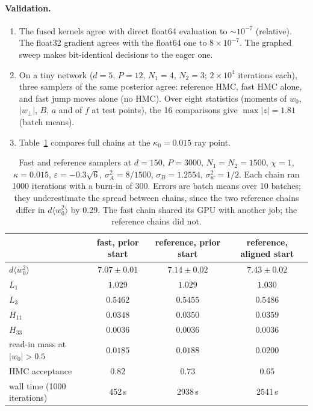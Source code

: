 \documentclass[11pt,a4paper]{article}
\begin{document}
\paragraph{Validation.}
\begin{enumerate}
  \item The fused kernels agree with direct float64 evaluation to $\sim10^{-7}$ (relative).
    The float32 gradient agrees with the float64 one to $8\times10^{-7}$.
    The graphed sweep makes bit-identical decisions to the eager one.
  \item On a tiny network ($d=5$, $P=12$, $N_1=4$, $N_2=3$; $2\times10^4$ iterations each), three samplers of the same posterior agree:
    reference HMC, fast HMC alone, and fast jump moves alone (no HMC).
    Over eight statistics (moments of $w_0$, $|w_\perp|$, $B$, $a$ and of $f$ at test points), the 16 comparisons give $\max|z|=1.81$ (batch means).
  \item Table~\ref{tab:fast} compares full chains at the $\kappa_0=0.015$ ray point.
\end{enumerate}

\begin{table}[h]
\centering
\begin{tabular}{lccc}
\toprule
 & fast, prior start & reference, prior start & reference, aligned start\\
\midrule
$d\langle w_0^2\rangle$ & $7.07\pm0.01$ & $7.14\pm0.02$ & $7.43\pm0.02$\\
$L_1$ & $1.029$ & $1.029$ & $1.030$\\
$L_3$ & $0.5462$ & $0.5455$ & $0.5486$\\
$H_{11}$ & $0.0348$ & $0.0350$ & $0.0359$\\
$H_{33}$ & $0.0036$ & $0.0036$ & $0.0036$\\
read-in mass at $|w_0|>0.5$ & $0.0185$ & $0.0188$ & $0.0200$\\
HMC acceptance & $0.82$ & $0.73$ & $0.65$\\
wall time (1000 iterations) & 452\,s & 2938\,s & 2541\,s\\
\bottomrule
\end{tabular}
\caption{Fast and reference samplers at $d=150$, $P=3000$, $N_1=N_2=1500$, $\chi=1$, $\kappa=0.015$, $\varepsilon=-0.3\sqrt6$,
$\sigma_A^2=8/1500$, $\sigma_B=1.2554$, $\sigma_w^2=1/2$. Each chain ran 1000 iterations with a burn-in of 300.
Errors are batch means over 10 batches; they underestimate the spread between chains, since the two reference chains differ in $d\langle w_0^2\rangle$ by 0.29.
The fast chain shared its GPU with another job; the reference chains did not.}
\label{tab:fast}
\end{table}
\end{document}
